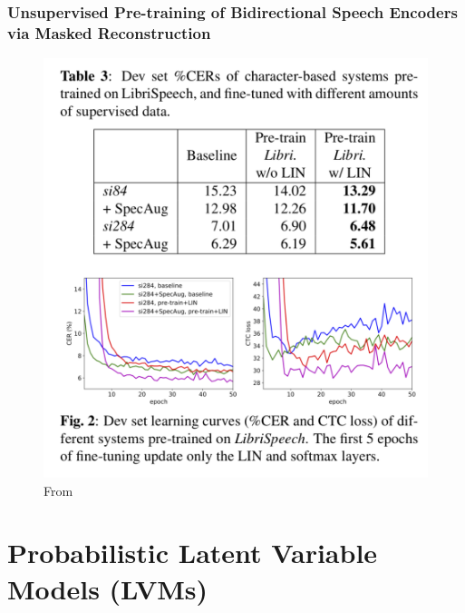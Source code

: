 \documentclass[table]{beamer}
\begin{document}
\begin{frame}
\frametitle{Unsupervised Pre-training of Bidirectional Speech Encoders via Masked Reconstruction}

	
		\begin{figure}
			\centering
			\includegraphics[scale=0.27]	{wang2020exp} 
			\caption{From  \citep{wang2020unsupervised}}
			\end{figure}

\end{frame}


\section{Probabilistic Latent Variable Models (LVMs)}
\end{document}
